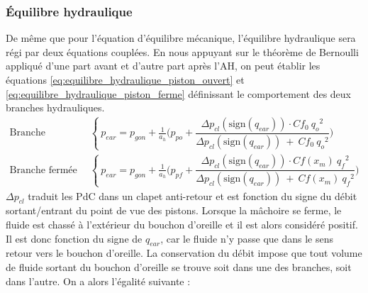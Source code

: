 			\subsubsection{Équilibre hydraulique}
			\label{sec:2.4.2.b_Mise en équation}
De même que pour l'équation d'équilibre mécanique, l'équilibre hydraulique sera régi par deux équations couplées. En nous appuyant sur le théorème de Bernoulli appliqué d'une part avant et d'autre part après l'AH, on peut établir les équations \ref{eq:equilibre_hydraulique_piston_ouvert} et \ref{eq:equilibre_hydraulique_piston_ferme} définissant le comportement des deux branches hydrauliques.
\begin{align}
\text{Branche ouverte~}& \left\{~
p_{ear} = p_{gon} + \frac{1}{a_h} \biggl( p_{po} +
		 \dfrac{\Delta p_{cl}(\text{sign}(q_{ear}))\cdot Cf_0\ {q_o}^2}{\Delta p_{cl}(\text{sign}(q_{ear}))\ +\ Cf_0\ {q_o}^2} \bigg)
\right.
\label{eq:equilibre_hydraulique_piston_ouvert}\\
\text{Branche fermée~}& \left\{~
p_{ear} = p_{gon} + \frac{1}{a_h} \biggl( p_{pf} +
 		\dfrac{\Delta p_{cl}(\text{sign}(q_{ear}))\cdot Cf(x_m)\ {q_f}^2}{\Delta p_{cl}(\text{sign}(q_{ear}))\ +\ Cf(x_m)\ {q_f}^2} \bigg)
\right.
\label{eq:equilibre_hydraulique_piston_ferme}
\end{align}
$\Delta p_{cl}$ traduit les PdC dans un clapet anti-retour et est fonction du signe du débit sortant/entrant du point de vue des pistons. Lorsque la mâchoire se ferme, le fluide est chassé à l'extérieur du bouchon d'oreille et il est alors considéré positif. Il est donc fonction du signe de $q_{ear}$, car le fluide n'y passe que dans le sens retour vers le bouchon d'oreille. 
La conservation du débit impose que tout volume de fluide sortant du bouchon d'oreille se trouve soit dans une des branches, soit dans l'autre. On a alors l'égalité suivante :
